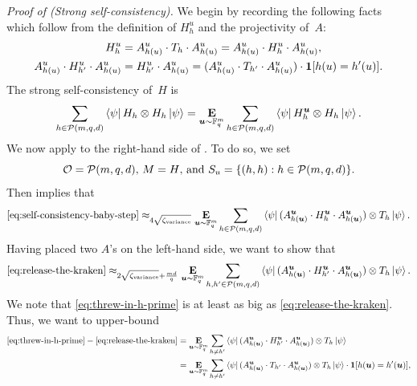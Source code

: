 \vspace{\baselineskip}
\noindent
\emph{Proof of  (Strong self-consistency).}
We begin by recording the following facts which follow from the definition of $H^u_h$ and the projectivity of~$A$:
\begin{align}
H^u_h &= A^u_{h(u)} \cdot T_h \cdot A^u_{h(u)} = A^u_{h(u)} \cdot H^u_h \cdot A^u_{h(u)},\label{eq:h-sandwich}\\
A^u_{h(u)} \cdot H^u_{h'} \cdot A^u_{h(u)} &=  H^u_{h'} \cdot A^u_{h(u)} = (A^u_{h(u)} \cdot T_{h'} \cdot A^u_{h(u)}) \cdot \boldsymbol{1}[h(u) = h'(u)].\label{eq:h-blt}
\end{align}
The strong self-consistency of~$H$ is
\begin{equation}\label{eq:self-consistency-baby-step}
\sum_{h\in\mathcal{P}(m, q, d)} \bra{\psi} H_h \otimes H_h \ket{\psi}
= \mathop{\bf E\/}_{\boldsymbol{u} \sim \mathbb F_q^m} \sum_{h \in \mathcal{P}(m, q, d)} \bra{\psi} H_h^{\boldsymbol{u}} \otimes H_h \ket{\psi}.
\end{equation}
We now apply  to the right-hand side of .
To do so, we set
\begin{equation*}
\text{$\mathcal{O} =\mathcal{P}(m, q, d)$, $M = H$, and $S_u = \{(h, h) : h \in \mathcal{P}(m, q, d)\}$.}
\end{equation*}
Then  implies that
\begin{equation}\label{eq:release-the-kraken}
\eqref{eq:self-consistency-baby-step}
\approx_{4 \sqrt{\zeta_{\mathrm{variance}}}}
\mathop{\bf E\/}_{\boldsymbol{u} \sim \mathbb F_q^m} \sum_{h \in \mathcal{P}(m, q, d)} \bra{\psi} (A^{\boldsymbol{u}}_{h(\boldsymbol{u})} \cdot H_h^{\boldsymbol{u}} \cdot A^{\boldsymbol{u}}_{h(\boldsymbol{u})}) \otimes T_h \ket{\psi}.
\end{equation}
Having placed two $A$'s on the left-hand side, we want to show that
\begin{equation}\label{eq:threw-in-h-prime}
\eqref{eq:release-the-kraken}
\approx_{2\sqrt{\zeta_{\mathrm{variance}}} + \frac{md}{q}}
\mathop{\bf E\/}_{\boldsymbol{u} \sim \mathbb F_q^m} \sum_{h, h' \in \mathcal{P}(m, q, d)} \bra{\psi} (A^{\boldsymbol{u}}_{h(\boldsymbol{u})} \cdot H^{\boldsymbol{u}}_{h'} \cdot A^{\boldsymbol{u}}_{h(\boldsymbol{u})}) \otimes T_h \ket{\psi}.
\end{equation}
We note that \eqref{eq:threw-in-h-prime} is at least as big as \eqref{eq:release-the-kraken}. Thus, we want to upper-bound
\begin{align}
\eqref{eq:threw-in-h-prime}-\eqref{eq:release-the-kraken}
& = \mathop{\bf E\/}_{\boldsymbol{u} \sim \mathbb F_q^m} \sum_{h \neq h'} \bra{\psi}  (A^{\boldsymbol{u}}_{h(\boldsymbol{u})} \cdot H^{\boldsymbol{u}}_{h'} \cdot A^{\boldsymbol{u}}_{h(\boldsymbol{u})}) \otimes T_h \ket{\psi}\nonumber\\
& = \mathop{\bf E\/}_{\boldsymbol{u} \sim \mathbb F_q^m} \sum_{h \neq h'} \bra{\psi}  (A^{\boldsymbol{u}}_{h(\boldsymbol{u})} \cdot T_{h'} \cdot A^{\boldsymbol{u}}_{h(\boldsymbol{u})}) \otimes T_h \ket{\psi} \cdot \boldsymbol{1}[h(\boldsymbol{u}) = h'(\boldsymbol{u})],\label{eq:added-indicator}
\end{align}
